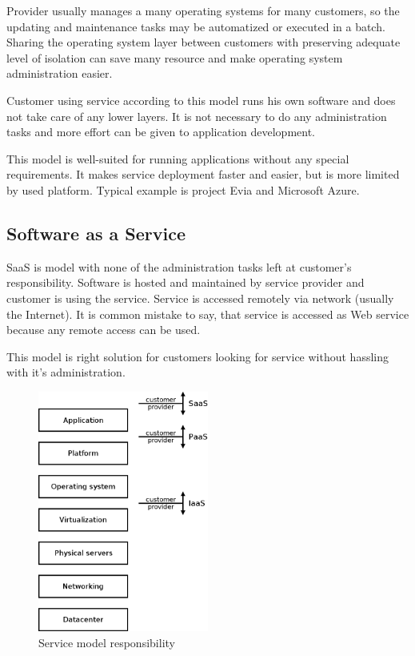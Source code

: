 Provider usually manages a many operating systems for many customers, so the updating and maintenance tasks may be automatized or executed in a batch. Sharing the operating system layer between customers with preserving adequate level of isolation can save many resource and make operating system administration easier.

Customer using service according to this model runs his own software and does not take care of any lower layers. It is not necessary to do any administration tasks and more effort can be given to application development. 

This model is well-suited for running applications without any special requirements. It makes service deployment faster and easier, but is more limited by used platform. 
Typical example is project Evia and Microsoft Azure.

\subsection{Software as a Service}
\Ac{SaaS} is model with none of the administration tasks left at customer's responsibility. Software is hosted and maintained by service provider and customer is using the service. Service is accessed remotely via network (usually the Internet). It is common mistake to say, that service is accessed as Web service because any remote access can be used. 

This model is right solution for customers looking for service without hassling with it's administration.

\begin{figure}[htb]
	\begin{center}
	\includegraphics[width=0.5\textwidth]{service-models.png}
	\end{center}
	\caption{Service model responsibility}
	\label{img:service-models}
\end{figure}

